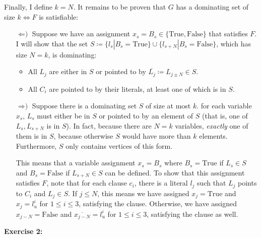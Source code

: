 \documentclass{amsart}
\theoremstyle{plain}
\theoremstyle{definition}
\begin{document}
    Finally, I define $k = N$.
    It remains to be proven that $G$ has a dominating set of size $k \iff F$ is satisfiable:


    \begin{itemize}

        \item[$\Longleftarrow\text{)}$] Suppose we have an assignment $x_s = B_s \in \{\text{True}, \text{False}\}$
        that satisfies $F$.
        I will show that the set $S \coloneqq \{l_s | B_s = \text{True}\} \cup \{l_{s+N} | B_s = \text{False}\}$,
        which has size $N=k$, is dominating:
        \begin{itemize}
            \item All $L_j$ are either in $S$ or pointed to by $ \overline{L_j} \coloneqq L_{j \pm N} \in S$.
            \item All $C_i$ are pointed to by their literals, at least one of which is in $S$.
        \end{itemize}

        \item[$\Longrightarrow\text{)}$] Suppose there is a dominating set $S$ of size at most $k$.
        for each variable $x_s$, $L_s$ must either be in $S$ or pointed to by an element of $S$
        (that is, one of $L_s, L_{s+N}$ is in $S$). In fact, because there are $N=k$ variables,
        \emph{exactly} one of them is in $S$, because otherwise $S$ would have more than $k$ elements.
        Furthermore, $S$ only contains vertices of this form.

        This means that a variable assignment $x_s = B_s$ where $B_s = \text{True}$
        if $L_s \in S$ and $B_s = \text{False}$ if $L_{s+N} \in S$ can be defined.
        To show that this assignment satisfies $F$, note that for each clause $c_i$, there is
        a literal $l_j$ such that $L_j$ points to $C_i$ and $L_j \in S$.
        If $j \leq N$, this means we have assigned $x_j = \text{True}$ and $x_j = l^i_u$ for $1 \leq i \leq 3$,
        satisfying the clause.
        Otherwise, we have assigned $x_{j-N} = \text{False}$ and $\overline{x_{j-N}} = l^i_u$ for $1 \leq i \leq 3$,
        satisfying the clause as well.

    \end{itemize}
    
    \textbf{Exercise 2:}


    \nocite{*}
    
    
\end{document}
